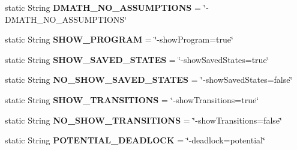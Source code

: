 \begin{DoxyCompactItemize}
\item 
\hypertarget{classedu_1_1udel_1_1cis_1_1vsl_1_1civl_1_1TestConstants_ade29aac3af90fa610937f12e057833c7}{}static String {\bfseries D\+M\+A\+T\+H\+\_\+\+N\+O\+\_\+\+A\+S\+S\+U\+M\+P\+T\+I\+O\+N\+S} = \char`\"{}-\/D\+M\+A\+T\+H\+\_\+\+N\+O\+\_\+\+A\+S\+S\+U\+M\+P\+T\+I\+O\+N\+S\char`\"{}\label{classedu_1_1udel_1_1cis_1_1vsl_1_1civl_1_1TestConstants_ade29aac3af90fa610937f12e057833c7}

\item 
\hypertarget{classedu_1_1udel_1_1cis_1_1vsl_1_1civl_1_1TestConstants_a1e1064e1baf2c5e0e01fe3c53484e260}{}static String {\bfseries S\+H\+O\+W\+\_\+\+P\+R\+O\+G\+R\+A\+M} = \char`\"{}-\/show\+Program=true\char`\"{}\label{classedu_1_1udel_1_1cis_1_1vsl_1_1civl_1_1TestConstants_a1e1064e1baf2c5e0e01fe3c53484e260}

\item 
\hypertarget{classedu_1_1udel_1_1cis_1_1vsl_1_1civl_1_1TestConstants_a4bd576ff567b9b6341e638da90e4725c}{}static String {\bfseries S\+H\+O\+W\+\_\+\+S\+A\+V\+E\+D\+\_\+\+S\+T\+A\+T\+E\+S} = \char`\"{}-\/show\+Saved\+States=true\char`\"{}\label{classedu_1_1udel_1_1cis_1_1vsl_1_1civl_1_1TestConstants_a4bd576ff567b9b6341e638da90e4725c}

\item 
\hypertarget{classedu_1_1udel_1_1cis_1_1vsl_1_1civl_1_1TestConstants_a4e16862ad25e29a94264820437789a0d}{}static String {\bfseries N\+O\+\_\+\+S\+H\+O\+W\+\_\+\+S\+A\+V\+E\+D\+\_\+\+S\+T\+A\+T\+E\+S} = \char`\"{}-\/show\+Saved\+States=false\char`\"{}\label{classedu_1_1udel_1_1cis_1_1vsl_1_1civl_1_1TestConstants_a4e16862ad25e29a94264820437789a0d}

\item 
\hypertarget{classedu_1_1udel_1_1cis_1_1vsl_1_1civl_1_1TestConstants_a0cbac46ead28cfb0b7adf387dcb9d5cd}{}static String {\bfseries S\+H\+O\+W\+\_\+\+T\+R\+A\+N\+S\+I\+T\+I\+O\+N\+S} = \char`\"{}-\/show\+Transitions=true\char`\"{}\label{classedu_1_1udel_1_1cis_1_1vsl_1_1civl_1_1TestConstants_a0cbac46ead28cfb0b7adf387dcb9d5cd}

\item 
\hypertarget{classedu_1_1udel_1_1cis_1_1vsl_1_1civl_1_1TestConstants_a35f06fcda55ede494a9a5ef6da4d08bd}{}static String {\bfseries N\+O\+\_\+\+S\+H\+O\+W\+\_\+\+T\+R\+A\+N\+S\+I\+T\+I\+O\+N\+S} = \char`\"{}-\/show\+Transitions=false\char`\"{}\label{classedu_1_1udel_1_1cis_1_1vsl_1_1civl_1_1TestConstants_a35f06fcda55ede494a9a5ef6da4d08bd}

\item 
\hypertarget{classedu_1_1udel_1_1cis_1_1vsl_1_1civl_1_1TestConstants_ab64373183e01fb7012648ceeb0a7b0f9}{}static String {\bfseries P\+O\+T\+E\+N\+T\+I\+A\+L\+\_\+\+D\+E\+A\+D\+L\+O\+C\+K} = \char`\"{}-\/deadlock=potential\char`\"{}\label{classedu_1_1udel_1_1cis_1_1vsl_1_1civl_1_1TestConstants_ab64373183e01fb7012648ceeb0a7b0f9}


\end{DoxyCompactItemize}
